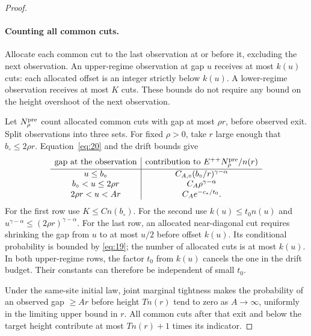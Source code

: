 \begin{proof}
\paragraph{Counting all common cuts.}
Allocate each common cut to the last observation at or before it,
excluding the next observation. An upper-regime observation at gap
\(u\) receives at most \(k(u)\) cuts: each allocated offset is an
integer strictly below \(k(u)\). A lower-regime observation receives
at most \(K\) cuts. These bounds do not require any bound on the
height overshoot of the next observation.

Let \(N_{\rho}^{\rm pre}\) count allocated common cuts with gap at
most \(\rho r\), before observed exit. Split observations into three
sets. For fixed \(\rho>0\), take \(r\) large enough that
\(b_\circ\le2\rho r\). Equation~\eqref{eq:20} and the drift bounds give
\[
\begin{array}{c|c}
\text{gap at the observation}&
\text{contribution to }E^{++}N_{\rho}^{\rm pre}/n(r)\\[2pt]\hline
u\le b_\circ&C_{A,\circ}(b_\circ/r)^{\gamma-\alpha}\\
b_\circ<u\le2\rho r&C_A\rho^{\gamma-\alpha}\\
2\rho r<u<Ar&C_Ae^{-c_*/t_0}.
\end{array}
\]
For the first row use \(K\le Cn(b_\circ)\). For the second use
\(k(u)\le t_0n(u)\) and
\(u^{\gamma-\alpha}\le(2\rho r)^{\gamma-\alpha}\). For the last
row, an allocated near-diagonal cut requires shrinking the gap from
\(u\) to at most \(u/2\) before offset \(k(u)\). Its conditional
probability is bounded by \eqref{eq:19}; the number of allocated
cuts is at most \(k(u)\). In both upper-regime rows, the factor \(t_0\)
from \(k(u)\) cancels the one in the drift budget. Their constants
can therefore be independent of small \(t_0\).

Under the same-site initial law, joint marginal tightness makes the
probability of an observed gap \(\ge Ar\) before height \(Tn(r)\)
tend to zero as \(A\to\infty\), uniformly in the limiting upper
bound in \(r\). All common cuts after that exit and below the target
height contribute at most \(Tn(r)+1\) times its indicator.


\end{proof}
